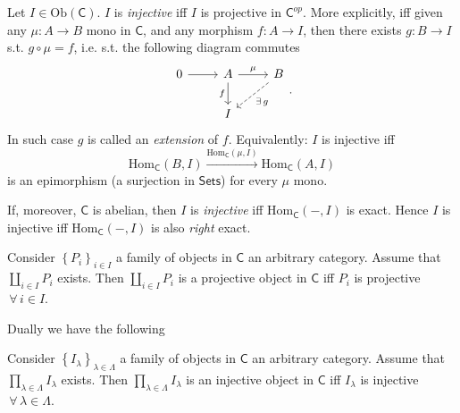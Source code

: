 \begin{defn}
	Let $I \in \mathrm{Ob} \left(\mathsf{C}\right)$.
	$I$ is {\em injective} iff $I$ is projective in $\mathsf{C}^{op}$.
	More explicitly, iff given any $\mu: A \to B$ mono in $\mathsf{C}$,
	and any morphism $f: A \to I$, then there exists $g: B \to I$ s.t. $g \circ \mu = f$,
	i.e. s.t. the following diagram commutes
	\begin{equation}
	\begin{tikzcd}
		0 \arrow[r, "", rightarrow]  &
		A \arrow[r, "\mu", rightarrow] \arrow[d, "f"', rightarrow] &
		B \arrow[dl, "\exists\, g", dashrightarrow] \\
		& I &
	\end{tikzcd}
	.\end{equation} 
	In such case $g$ is called an {\em extension} of $f$.\newline
	Equivalently:
	$I$ is injective iff
	\begin{equation}
	\mathrm{Hom}_{\mathsf{C}} \left( B, I \right) \xrightarrow{\mathrm{Hom}_{\mathsf{C}} \left( \mu, I \right)} 
	\mathrm{Hom}_{\mathsf{C}} \left( A, I \right)
	\end{equation} 
	is an epimorphism (a surjection in $\mathsf{Sets}$) for every $\mu$ mono.
\end{defn}

\begin{rem}
	If, moreover, $\mathsf{C}$ is abelian, then
	$I$ is {\em injective} iff $\mathrm{Hom}_{\mathsf{C}} \left( -, I \right)$ is exact.
	Hence $I$ is injective iff $\mathrm{Hom}_{\mathsf{C}} \left( -, I\right)$ is also {\em right} exact.
\end{rem}

\begin{prop}
	Consider $\left\{ P_i \right\}_{i \in I}$ a family of objects in $\mathsf{C}$ an arbitrary category.
	Assume that $\coprod_{i \in I} P_i$ exists.
	Then $\coprod_{i \in I} P_i$ is a projective object in $\mathsf{C}$ 
	iff $P_i$ is projective $\,\forall\, i \in I$.
\end{prop} 

Dually we have the following

\begin{prop}
	Consider $\left\{ I_\lambda \right\}_{\lambda \in \Lambda}$ a family of objects in $\mathsf{C}$ an arbitrary category.
	Assume that $\prod_{\lambda \in \Lambda} I_\lambda$ exists.
	Then $\prod_{\lambda \in \Lambda} I_\lambda$ is an injective object in $\mathsf{C}$ 
	iff $I_\lambda$ is injective $\,\forall\, \lambda \in \Lambda$.
\end{prop} 

